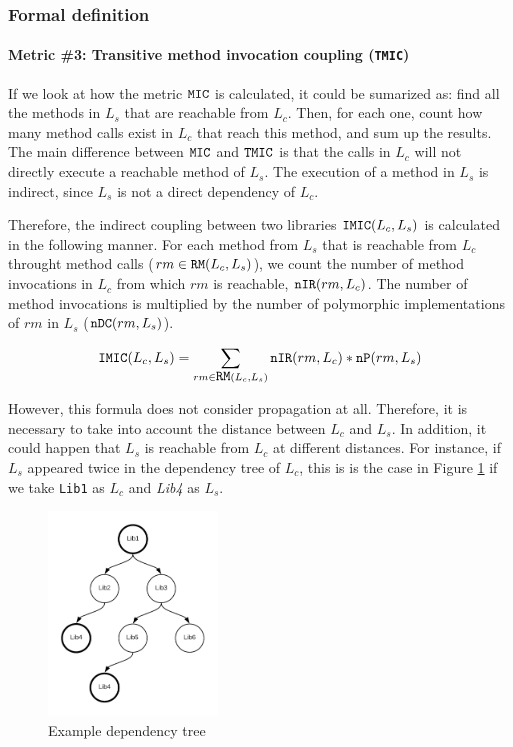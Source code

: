 \subsubsection{Formal definition}

\paragraph{Metric \#3: Transitive method invocation coupling (\texttt{TMIC})}
If we look at how the metric $\verb|MIC|$ is calculated, it could be sumarized as: find all the methods in $L_s$ that are reachable from $L_c$. Then, for each one, count how many method calls exist in $L_c$ that reach this method, and sum up the results. The main difference between $\verb|MIC|$ and $\verb|TMIC|$ is that the calls in $L_c$ will not directly execute a reachable method of $L_s$. The execution of a method in $L_s$ is indirect, since $L_s$ is not a direct dependency of $L_c$.

Therefore, the indirect coupling between two libraries $\verb|IMIC|(L_c, L_s)$ is calculated in the following manner. For each method from $L_s$ that is reachable from $L_c$ throught method calls ($rm \in \verb|RM|(L_c,L_s)$), we count the number of method invocations in $L_c$ from which $rm$ is reachable, $\verb|nIR|(rm, L_c)$. The number of method invocations is multiplied by the number of polymorphic implementations of $rm$ in $L_s$ ($\verb|nDC|(rm, L_s)$).

\begin{equation}
\label{eqn:imic}
  \verb|IMIC|(L_c,L_s) = \sum_{rm \in \verb|RM|(L_c,L_s)} \verb|nIR|(rm,L_c) * \verb|nP|(rm, L_s)
\end{equation}

However, this formula does not consider propagation at all. Therefore, it is necessary to take into account the distance between $L_c$ and $L_s$. In addition, it could happen that $L_s$ is reachable from $L_c$ at different distances. For instance, if $L_s$ appeared twice in the dependency tree of $L_c$, this is is the case in Figure \ref{fig:dependency-tree} if we take \texttt{Lib1} as $L_c$ and \textit{Lib4} as $L_s$.

\begin{figure}[ht]
\begin{center}
\includegraphics[width=0.4\textwidth]{figures/Thesis-DependencyTree.png}
\caption{Example dependency tree}
\label{fig:dependency-tree}
\end{center}
\end{figure}

